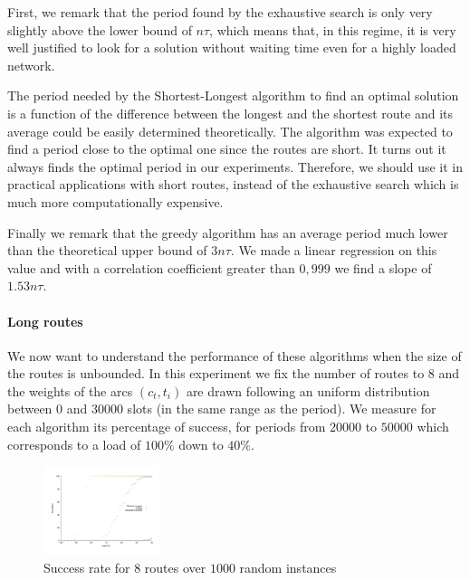 \documentclass[10pt, conference, letterpaper]{IEEEtran}
\begin{document}
      First, we remark that the period found by the exhaustive search is only very slightly above the lower bound of $n\tau$, which means that, in this regime, it is very well justified to look for a solution without waiting time even for a highly loaded network. 
      
      The period needed by the Shortest-Longest algorithm to find an optimal solution is a function of the difference between the longest and the shortest route and its average could be easily determined theoretically. The algorithm was expected to find a period close to the optimal one since the routes are short. It turns out it always finds the optimal period in our experiments. Therefore, we should use it in practical applications with short routes, instead of the exhaustive search which is much more computationally expensive. 
      
      Finally we remark that the greedy algorithm has an average period much lower than the theoretical upper bound of $3n\tau$. We made a linear regression on this value and with a correlation coefficient greater than $0,999$ we find a slope of $1.53n\tau$.
      
      

      \paragraph{Long routes}
      
      We now want to understand the performance of these algorithms when the size of the routes is unbounded. In this experiment we fix the number of routes to $8$ and the weights of the arcs $(c_t,t_i)$ are drawn following an uniform distribution between $0$ and $30000$ slots (in the same range as the period). We measure for each algorithm its percentage of success, for periods from $20000$ to $50000$ which corresponds to a load of $100\%$ down to $40\%$.
      
\begin{figure}[H]

       \begin{center}
      \hspace{-0.5cm}\includegraphics[width=0.3\textwidth]{echec_longues.pdf}
      \end{center}
            \vspace{-1cm}
      \caption{Success rate for $8$ routes over $1000$ random instances}
     \end{figure}
      
\end{document}
